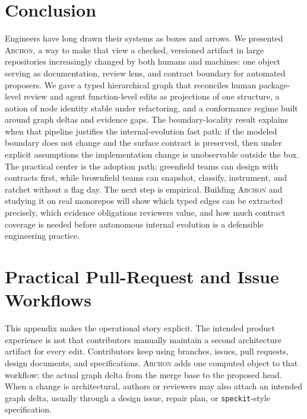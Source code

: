 \documentclass[sigconf,review,anonymous]{acmart}
\theoremstyle{plain}
\theoremstyle{definition}
\begin{document}
\section{Conclusion}\label{sec:conclusion}

Engineers have long drawn their systems as boxes and arrows. We presented
\textsc{Archon}, a way to make that view a checked, versioned artifact in large
repositories increasingly changed by both humans and machines: one object
serving as documentation, review lens, and contract boundary for automated
proposers. We gave a typed
hierarchical graph that reconciles human package-level review and agent
function-level edits as projections of one structure, a notion of node identity
stable under refactoring, and a conformance regime built around graph deltas and
evidence gaps. The boundary-locality result explains when that pipeline justifies
the internal-evolution fast path: if the modeled boundary does not change and
the surface contract is preserved, then under explicit assumptions the
implementation change is unobservable outside the box. The practical center is
the adoption path: greenfield teams can design with contracts first, while
brownfield teams can snapshot, classify, instrument, and ratchet without a flag
day. The next step is empirical. Building \textsc{Archon}
and studying it on real monorepos will show which typed edges can be extracted
precisely, which evidence obligations reviewers value, and how much contract
coverage is needed before autonomous internal evolution is a defensible
engineering practice.

\appendix

\section{Practical Pull-Request and Issue Workflows}\label{app:workflow}

This appendix makes the operational story explicit. The intended product
experience is not that contributors manually maintain a second architecture
artifact for every edit. Contributors keep using branches, issues, pull
requests, design documents, and specifications. \textsc{Archon} adds one
computed object to that workflow: the actual graph delta from the merge base to
the proposed head. When a change is architectural, authors or reviewers may also
attach an intended graph delta, usually through a design issue, repair plan, or
\texttt{speckit}-style specification.
\end{document}
